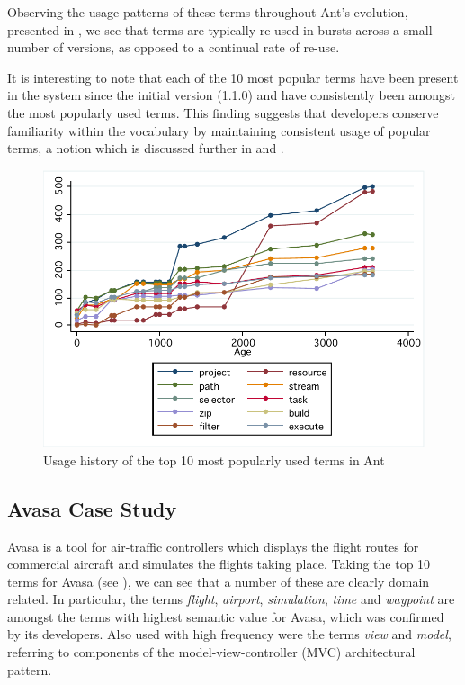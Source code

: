 Observing the usage patterns of these terms throughout Ant's evolution, presented in , we see that terms are typically re-used in bursts across a small number of versions, as opposed to a continual rate of re-use.

It is interesting to note that each of the 10 most popular terms have been present in the system since the initial version (1.1.0) and have consistently been amongst the most popularly used terms. This finding suggests that  developers conserve familiarity within the vocabulary by maintaining consistent usage of popular terms, a notion which is discussed further in  and .

\begin{figure}[t]
\centering
\includegraphics[width=\textwidth]{Figures/Vocab-AntPopular.pdf}
\caption{Usage history of the top 10 most popularly used terms in Ant}
\label{fig:vocab_popular_terms_ant}
\end{figure}


\subsection{Avasa Case Study} %
\label{sub:avasa_case_study}

Avasa is a tool for air-traffic controllers which displays the flight routes for commercial aircraft and simulates the flights taking place. Taking the top 10 terms for Avasa (see ), we can see that a number of these are clearly domain related. In particular, the terms \emph{flight}, \emph{airport}, \emph{simulation}, \emph{time} and \emph{waypoint} are amongst the terms with highest semantic value for Avasa, which was confirmed by its developers. Also used with high frequency were the terms \emph{view} and \emph{model}, referring to components of the model-view-controller (MVC) architectural pattern.

